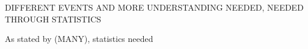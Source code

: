 \par 
DIFFERENT EVENTS AND MORE UNDERSTANDING NEEDED, NEEDED THROUGH STATISTICS

As stated by (MANY), statistics needed

\newpage 


